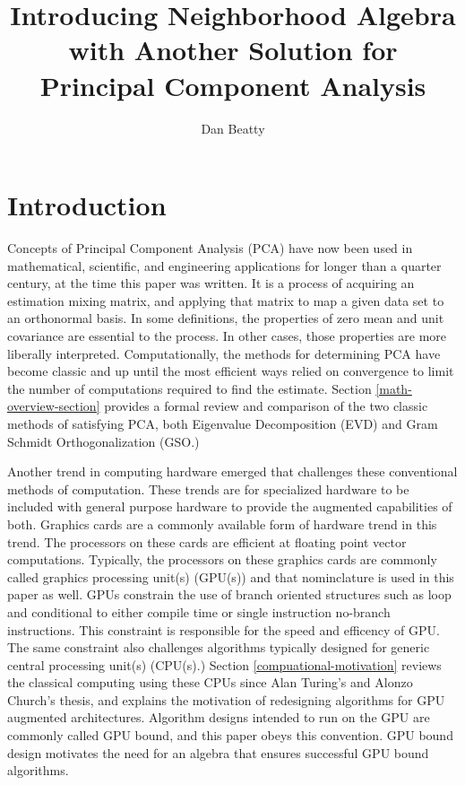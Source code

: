 \documentclass[11pt]{article}
\title{Introducing Neighborhood Algebra with Another Solution for Principal Component Analysis}
\author{Dan Beatty}
\begin{document}
\maketitle

\section{Introduction}
Concepts of Principal Component Analysis (PCA) have now been used in mathematical, scientific, and engineering applications for longer than a quarter century, at the time this paper was written.   It is a process of acquiring an estimation mixing matrix, and applying that matrix to map a given data set to an orthonormal basis.  In some definitions, the properties of zero mean and unit covariance are essential to the process.  In other cases, those properties are more liberally interpreted.  Computationally, the methods for determining PCA have become classic and up until the most efficient ways relied on convergence to limit the number of computations required to find the estimate.   Section \ref{math-overview-section} provides a formal review and comparison of the two classic methods of satisfying PCA, both Eigenvalue Decomposition (EVD) and Gram Schmidt Orthogonalization (GSO.)   %

Another trend in computing hardware emerged that challenges these conventional methods of computation.  These trends are for specialized hardware to be included with general purpose hardware to provide the augmented capabilities of both.   Graphics cards are a commonly available form of hardware trend in this trend.  %
The processors on these cards are efficient at floating point vector computations.  Typically, the processors on these graphics cards are commonly called graphics processing unit(s) (GPU(s)) and that nominclature is used in this paper as well.   %
GPUs constrain the use of branch oriented structures such as loop and conditional to either compile time or single instruction no-branch instructions.  This constraint is responsible for the speed and efficency of GPU.  The same constraint also challenges algorithms typically designed for generic central processing unit(s) (CPU(s).)   Section \ref{compuational-motivation} reviews the classical computing using these CPUs since Alan Turing's and Alonzo Church's thesis,  and explains the motivation of redesigning algorithms for GPU augmented architectures.    Algorithm designs intended to run on the GPU are commonly called GPU bound, and this paper obeys this convention.  
GPU bound design motivates the need for an algebra that ensures successful GPU bound algorithms.  
\end{document}
